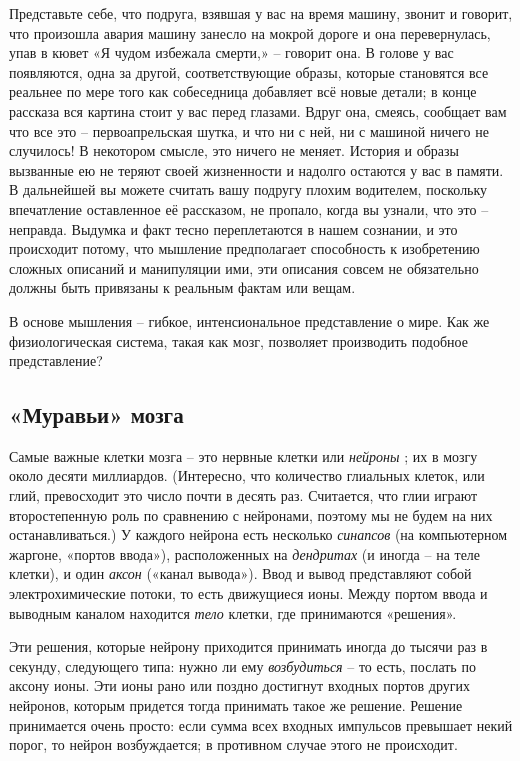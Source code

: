 \documentclass[../main.tex]{subfiles}
\begin{document}
Представьте себе, что подруга, взявшая у вас на время машину, звонит и говорит, что произошла авария машину занесло на мокрой дороге и она перевернулась, упав в кювет «Я чудом избежала смерти,» \--- говорит она. В голове у вас появляются, одна за другой, соответствующие образы, которые становятся все реальнее по мере того как собеседница добавляет всё новые детали; в конце рассказа вся картина стоит у вас перед глазами. Вдруг она, смеясь, сообщает вам что все это \--- первоапрельская шутка, и что ни с ней, ни с машиной ничего не случилось! В некотором смысле, это ничего не меняет. История и образы вызванные ею не теряют своей жизненности и надолго остаются у вас в памяти. В дальнейшей вы можете считать вашу подругу плохим водителем, поскольку впечатление оставленное её рассказом, не пропало, когда вы узнали, что это \--- неправда. Выдумка и факт тесно переплетаются в нашем сознании, и это происходит потому, что мышление предполагает способность к изобретению сложных описаний и манипуляции ими, эти описания совсем не обязательно должны быть привязаны к реальным фактам или вещам.

В основе мышления \--- гибкое, интенсиональное представление о мире. Как же физиологическая система, такая как мозг, позволяет производить подобное представление?


\subsection{«Муравьи» мозга}

Самые важные клетки мозга \--- это нервные клетки или \emph{нейроны} ; их в мозгу около десяти миллиардов. (Интересно, что количество глиальных клеток, или глий, превосходит это число почти в десять раз. Считается, что глии играют второстепенную роль по сравнению с нейронами, поэтому мы не будем на них останавливаться.) У каждого нейрона есть несколько \emph{синапсов} (на компьютерном жаргоне, «портов ввода»), расположенных на \emph{дендритах} (и иногда \--- на теле клетки), и один \emph{аксон} («канал вывода»). Ввод и вывод представляют собой электрохимические потоки, то есть движущиеся ионы. Между портом ввода и выводным каналом находится \emph{тело} клетки, где принимаются «решения».

Эти решения, которые нейрону приходится принимать иногда до тысячи раз в секунду, следующего типа: нужно ли ему \emph{возбудиться} \--- то есть, послать по аксону ионы. Эти ионы рано или поздно достигнут входных портов других нейронов, которым придется тогда принимать такое же решение. Решение принимается очень просто: если сумма всех входных импульсов превышает некий порог, то нейрон возбуждается; в противном случае этого не происходит.
\end{document}
